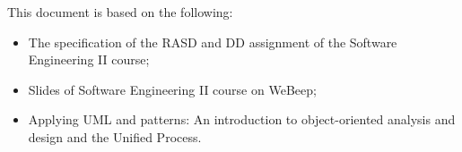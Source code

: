 This document is based on the following:
\begin{itemize}
    \item The specification of the RASD and DD assignment of the Software Engineering II course;
    \item Slides of Software Engineering II course on WeBeep;
    \item Applying UML and patterns: An introduction to object-oriented analysis and design and the Unified Process. 
\end{itemize}
